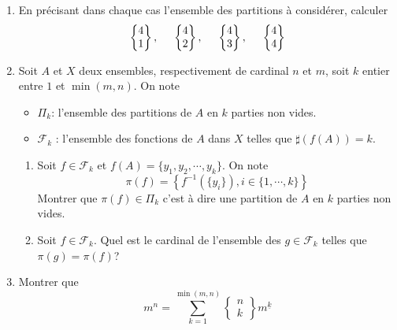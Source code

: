\begin{enumerate}
 \item En précisant dans chaque cas l'ensemble des partitions à considérer, calculer
\begin{displaymath}
 \left\lbrace \begin{matrix}
 4 \\ 1
\end{matrix}\right\rbrace , \hspace{0.5cm}
 \left\lbrace \begin{matrix}
 4 \\ 2
\end{matrix}\right\rbrace , \hspace{0.5cm}
 \left\lbrace \begin{matrix}
 4 \\ 3
\end{matrix}\right\rbrace , \hspace{0.5cm}
 \left\lbrace \begin{matrix}
 4 \\ 4
\end{matrix}\right\rbrace
\end{displaymath}
\item  Soit $A$ et $X$ deux ensembles, respectivement de cardinal $n$ et $m$, soit $k$ entier entre $1$ et $\min(m,n)$. On note
\begin{itemize}
 \item $\Pi_k$: l'ensemble des partitions de $A$ en $k$ parties non vides.
 \item $\mathcal{F}_k$ : l'ensemble des fonctions de $A$ dans $X$ telles que $\sharp(f(A))=k$.
\end{itemize}
\begin{enumerate}
 \item Soit $f\in \mathcal{F}_k$ et $f(A)=\{y_1,y_2,\cdots,y_k\}$. On note
\begin{displaymath}
 \pi(f)=\left\lbrace f^{-1}(\{y_i\}) , i\in\{1,\cdots,k\}\right\rbrace
\end{displaymath}
 Montrer que $\pi(f)\in \Pi_k$ c'est à dire une partition de $A$ en $k$ parties non vides.
 \item  Soit $f\in \mathcal{F}_k$. Quel est le cardinal de l'ensemble des $g\in \mathcal{F}_k$ telles que $\pi(g)=\pi(f)$? 
\end{enumerate}

\item Montrer que
\begin{displaymath}
 m^n = \sum_{k=1}^{\min(m,n)}
 \left\lbrace \begin{matrix}
 n \\ k
\end{matrix}\right\rbrace
m^{\underline{k}}
\end{displaymath}

\end{enumerate}
